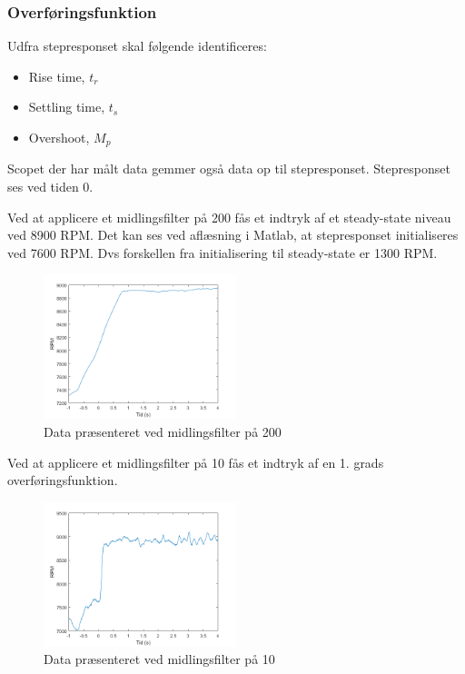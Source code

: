 \subsubsection{Overføringsfunktion}

\label{sec:overforingsfunktion}
Udfra stepresponset skal følgende identificeres:

\begin{itemize}
\item Rise time, $t_r$
\item Settling time, $t_s$
\item Overshoot, $M_p$
\end{itemize}

Scopet der har målt data gemmer også data op til stepresponset. Stepresponset ses ved tiden 0.

Ved at applicere et midlingsfilter på 200 fås et indtryk af et steady-state niveau ved 8900 RPM. Det kan ses ved aflæsning i Matlab, at stepresponset initialiseres ved 7600 RPM. Dvs forskellen fra initialisering til steady-state er 1300 RPM. 

\begin{figure}[h]
  \centering
  \includegraphics[width=0.5\textwidth]{./figurer/mo4.png}
  \caption{Data præsenteret ved midlingsfilter på 200}
  \label{fig:mo4}
\end{figure}

Ved at applicere et midlingsfilter på 10 fås et indtryk af en 1. grads overføringsfunktion.

\begin{figure}[h]
  \centering
  \includegraphics[width=0.5\textwidth]{./figurer/mo5.png}
  \caption{Data præsenteret ved midlingsfilter på 10}
  \label{fig:mo5}
\end{figure}

